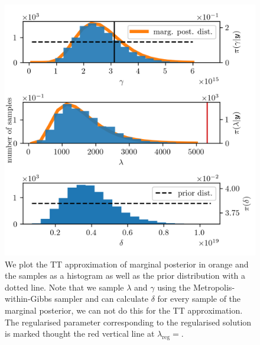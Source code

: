 \begin{figure}[ht!]
	\centering
	\includegraphics{secMargO3Res.png}
	\caption[Marginal posterior histograms and TT approximation as well as hyper-prior distribution.]{We plot the TT approximation of marginal posterior in orange and the samples as a histogram as well as the prior distribution with a dotted line. Note that we sample $\lambda$ and $\gamma$ using the Metropolis-within-Gibbs sampler and can calculate $\delta$ for every sample of the marginal posterior, we can not do this for the TT approximation. The regularised parameter corresponding to the regularised solution is marked thought the red vertical line at $\lambda_{\text{reg}} =$.}
	\label{fig:MargPostHistTT}
\end{figure}

